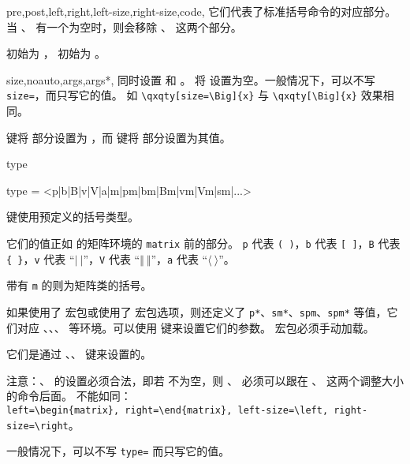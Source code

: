 \documentclass{ctxdoc}
\def\emph#1{\textcolor{red!80!black}{#1}}
\begin{document}
\begin{function}{
    pre,post,left,right,left-size,right-size,code,
}
    它们代表了标准括号命令的对应部分。当 、 
    有一个为空时，则会移除 、 这两个部分。

     初始为 ， 初始为 。
\end{function}

\begin{function}{
    size,noauto,args,args*,
}
     同时设置  和 。
    将  设置为空。一般情况下，可以不写 \verb|size=|，而只写它的值。
    如 \verb|\qxqty[size=\Big]{x}| 与 \verb|\qxqty[\Big]{x}| 效果相同。

     键将  部分设置为 ，而  键将
     部分设置为其值。
\end{function}

\begin{function}{type}
    \begin{syntax}
        type = <p|b|B|v|V|a|m|pm|bm|Bm|vm|Vm|sm|...> 
    \end{syntax}
     键使用预定义的括号类型。

    它们的值正如  的矩阵环境的 \verb|matrix| 前的部分。
    \verb|p| 代表 \verb|( )|，\verb|b| 代表 \verb|[ ]|，\verb|B| 代表 
    \verb|{ }|，\verb|v| 代表 “$\vert\ \vert$”，\verb|V| 
    代表 “$\Vert\ \Vert$”，\verb|a| 代表 “$\langle\ \rangle$”。

    带有 \verb|m| 的则为矩阵类的括号。

    如果使用了  宏包或使用了  宏包选项，则还定义了 \verb|p*|、\verb|sm*|、\verb|spm|、\verb|spm*| 等值，它们对应
    、、、 等环境。可以使用  键来设置它们的参数。 宏包必须手动加载。

    它们是通过 、、 键来设置的。

    \emph{注意：、\opt{right} 的设置必须合法，即若 \opt{size} 不为空，则 \opt{left}、\opt{right} 必须可以跟在 \tn{left}、\tn{right} 这两个调整大小的命令后面。} 不能如同：\\
    \verb|left=\begin{matrix}, right=\end{matrix}, left-size=\left, right-size=\right|。

    一般情况下，可以不写 \verb|type=| 而只写它的值。
\end{function}
\end{document}
